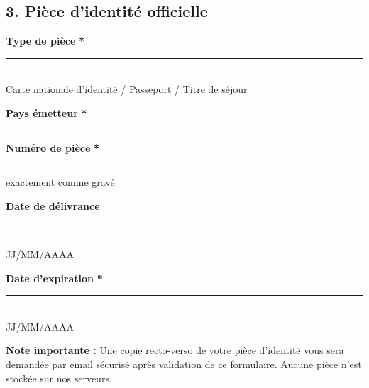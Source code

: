 \documentclass[12pt, a4paper]{article}
\newcommand{\required}{\textcolor{redalert}{\textbf{*}}}
\newcommand{\formfield}[2][]{%
    \par\noindent
    \begin{minipage}[t]{0.3\textwidth}
        \textbf{#2} \required
    \end{minipage}%
    \begin{minipage}[t]{0.68\textwidth}
        \rule{\linewidth}{0.4pt}%
        \ifblank{#1}{}{%
            \vspace{0.1cm}\newline
            {\tiny \textcolor{ethicGreenLight}{#1}}%
        }%
    \end{minipage}%
    \par\vspace{0.2cm}%
}
\begin{document}
\begin{sectionbox}
    \subsection*{3.  Pièce d'identité officielle}
    
    \vspace{0.3cm}
    \noindent
    \begin{minipage}[t]{0.48\textwidth}
        \textbf{Type de pièce} \required \\
        \rule{\linewidth}{0.4pt} \\
        {\tiny \textcolor{ethicGreenLight}{Carte nationale d'identité / Passeport / Titre de séjour}}
    \end{minipage}%
    \hfill
    \begin{minipage}[t]{0.48\textwidth}
        \textbf{Pays émetteur} \required \\
        \rule{\linewidth}{0.4pt}
    \end{minipage}
    
    \formfield{Numéro de pièce}{exactement comme gravé}
    
    \vspace{0.3cm}
    \noindent
    \begin{minipage}[t]{0.48\textwidth}
        \textbf{Date de délivrance} \\
        \rule{\linewidth}{0.4pt} \\
        {\tiny \textcolor{ethicGreenLight}{JJ/MM/AAAA}}
    \end{minipage}%
    \hfill
    \begin{minipage}[t]{0.48\textwidth}
        \textbf{Date d'expiration} \required \\
        \rule{\linewidth}{0.4pt} \\
        {\tiny \textcolor{ethicGreenLight}{JJ/MM/AAAA}}
    \end{minipage}
    
    \vspace{0.3cm}
    \begin{highlightbox}
        \centering
        \textbf{Note importante :} Une copie recto-verso de votre pièce d'identité vous sera demandée par email sécurisé après validation de ce formulaire. Aucune pièce n'est stockée sur nos serveurs.
    \end{highlightbox}
\end{sectionbox}
\end{document}
